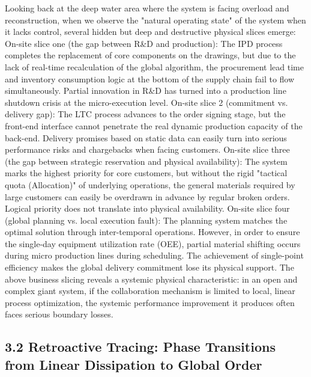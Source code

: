 \documentclass[11pt,a4paper]{article}
\begin{document}
Looking back at the deep water area where the system is facing overload and reconstruction, when we observe the "natural operating state" of the system when it lacks control, several hidden but deep and destructive physical slices emerge: On-site slice one (the gap between R\&D and production): The IPD process completes the replacement of core components on the drawings, but due to the lack of real-time recalculation of the global algorithm, the procurement lead time and inventory consumption logic at the bottom of the supply chain fail to flow simultaneously. Partial innovation in R\&D has turned into a production line shutdown crisis at the micro-execution level. On-site slice 2 (commitment vs. delivery gap): The LTC process advances to the order signing stage, but the front-end interface cannot penetrate the real dynamic production capacity of the back-end. Delivery promises based on static data can easily turn into serious performance risks and chargebacks when facing customers. On-site slice three (the gap between strategic reservation and physical availability): The system marks the highest priority for core customers, but without the rigid "tactical quota (Allocation)" of underlying operations, the general materials required by large customers can easily be overdrawn in advance by regular broken orders. Logical priority does not translate into physical availability. On-site slice four (global planning vs. local execution fault): The planning system matches the optimal solution through inter-temporal operations. However, in order to ensure the single-day equipment utilization rate (OEE), partial material shifting occurs during micro production lines during scheduling. The achievement of single-point efficiency makes the global delivery commitment lose its physical support. The above business slicing reveals a systemic physical characteristic: in an open and complex giant system, if the collaboration mechanism is limited to local, linear process optimization, the systemic performance improvement it produces often faces serious boundary losses.


\subsection*{3.2 Retroactive Tracing: Phase Transitions from Linear Dissipation to Global Order}
\end{document}
